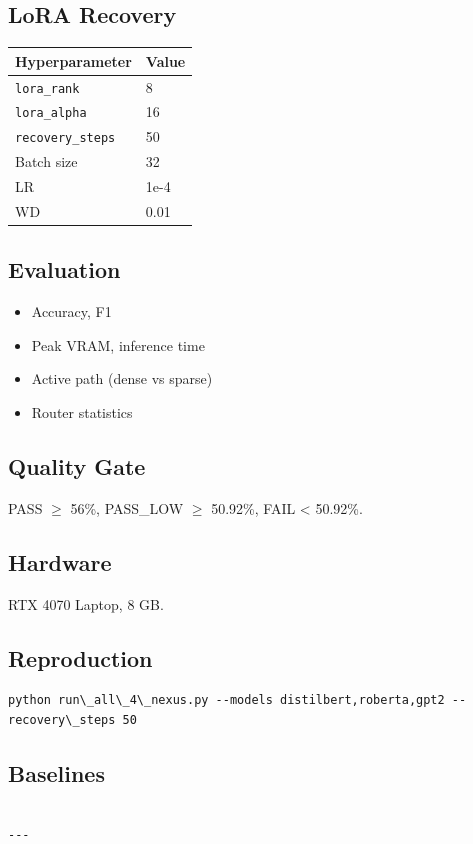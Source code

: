 \subsection{LoRA Recovery}

\begin{table}[H]
\centering
\small
\begin{tabular}{ll}
\toprule
\textbf{Hyperparameter} & \textbf{Value} \\
\midrule
\texttt{lora\_rank} & 8 \\
\texttt{lora\_alpha} & 16 \\
\texttt{recovery\_steps} & 50 \\
Batch size & 32 \\
LR & 1e-4 \\
WD & 0.01 \\
\bottomrule
\end{tabular}
\end{table}

\subsection{Evaluation}

\begin{itemize}
\item Accuracy, F1
\item Peak VRAM, inference time
\item Active path (dense vs sparse)
\item Router statistics

\end{itemize}
\subsection{Quality Gate}

PASS $\ge$ 56\%, PASS\_LOW $\ge$ 50.92\%, FAIL \textless{} 50.92\%.

\subsection{Hardware}

RTX 4070 Laptop, 8 GB.

\subsection{Reproduction}

\begin{lstlisting}
python run\_all\_4\_nexus.py --models distilbert,roberta,gpt2 --recovery\_steps 50
\end{lstlisting}

\subsection{Baselines}

\begin{lstlisting}

---
\end{lstlisting}